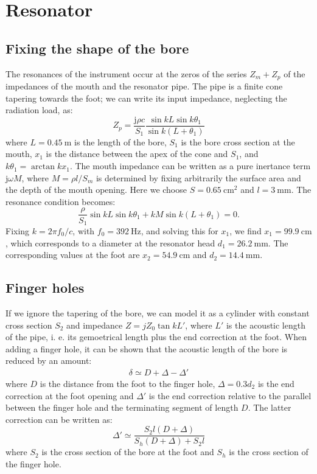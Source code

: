 \documentclass[a4paper]{article}
\begin{document}
\section{Resonator}
\subsection{Fixing the shape of the bore}
The resonances of the instrument occur at the zeros of the series $Z_m + Z_p$ of the impedances of the mouth and the resonator pipe. The pipe is a finite cone tapering towards the foot; we can write its input impedance, neglecting the radiation load, as:
$$ Z_p = \frac{\mathrm{j} \rho c }{S_1} \frac{\sin kL \sin k\theta_1}{\sin k(L+\theta_1)} $$
where $L = 0.45~\si{\meter}$ is the length of the bore, $S_1$ is the bore cross section at the mouth, $x_1$ is the distance between the apex of the cone and $S_1$, and $k\theta_1 = \arctan kx_1 $.
The mouth impedance can be written as a pure inertance term $\mathrm{j} \omega M$, where $M = \rho l / S_m$ is determined by fixing arbitrarily the surface area and the depth of the mouth opening. Here we choose $S = 0.65~\si{\centi\meter\squared}$ and $l = 3~\si{\milli\meter}$. 
The resonance condition becomes:
$$ \frac{\rho}{S_1} \sin kL \sin k\theta_1 + kM\sin k(L+\theta_1) = 0 .$$ 
Fixing $k = 2\pi f_0 /c$, with $f_0 = 392~\si{\hertz}$, and solving this for $x_1$, we find $x_1 = 99.9~\si{\centi\meter}$, which corresponds to a diameter at the resonator head $d_1 = 26.2~\si{\milli\meter}$. The corresponding values at the foot are $x_2 = 54.9~\si{\centi\meter}$ and $d_2 = 14.4~\si{\milli\meter}$.

\subsection{Finger holes}
If we ignore the tapering of the bore, we can model it as a cylinder with constant cross section $S_2$ and impedance $Z = jZ_0\tan kL'$, where $L'$ is the acoustic length of the pipe, i. e. its gemoetrical length plus the end correction at the foot.
When adding a finger hole, it can be shown that the acoustic length of the bore is reduced by an amount:
\begin{align*}
	\delta \simeq D + \Delta - \Delta' 
\end{align*}
where $D$ is the distance from the foot to the finger hole, $\Delta = 0.3d_2$ is the end correction at the foot opening and $\Delta'$ is the end correction relative to the parallel between the finger hole and the terminating segment of length $D$. The latter correction can be written as:
$$ \Delta' \simeq \frac{S_2 l(D+\Delta)}{S_h(D+\Delta) + S_2 l} $$
where $S_2$ is the cross section of the bore at the foot and $S_h$ is the cross section of the finger hole.
\end{document}
